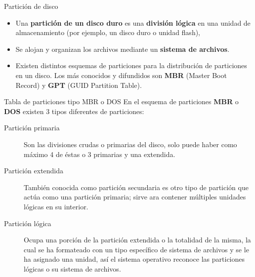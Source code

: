 \begin{frame}[c]{Partición de disco}
  \begin{center}
  \end{center}
  \begin{itemize}
    \item Una \textbf{partición de un disco duro} es una \textbf{división
      lógica} en una unidad de almacenamiento (por ejemplo, un disco duro o
      unidad flash),
    \pausa
    \item Se alojan y organizan los archivos mediante un \textbf{sistema de
    archivos}.
    \pausa
    \item Existen distintos esquemas de particiones para la distribución de
      particiones en un disco. Los más conocidos y difundidos son
      \textbf{MBR} (Master Boot Record) y \textbf{GPT} (GUID Partition Table).
  \end{itemize}
\end{frame}

\begin{frame}[c]{Tabla de particiones tipo MBR o DOS}
  En el esquema de particiones \textbf{MBR} o \textbf{DOS} existen 3 tipos
  diferentes de particiones:

  \pausa
  \vspace{\baselineskip}
  \begin{description}
    \item[Partición primaria] Son las divisiones crudas o primarias del disco,
      solo puede haber como máximo 4 de éstas o 3 primarias y una extendida.
    \pausa
    \item[Partición extendida] También conocida como partición secundaria es
      otro tipo de partición que actúa como una partición primaria; sirve
      ara contener múltiples unidades lógicas en su interior.
    \pausa
    \item[Partición lógica] Ocupa una porción de la partición extendida o la
      totalidad de la misma, la cual se ha formateado con un tipo específico
      de sistema de archivos y se le ha asignado una unidad, así el sistema
      operativo reconoce las particiones lógicas o su sistema de archivos.
  \end{description}
\end{frame}

